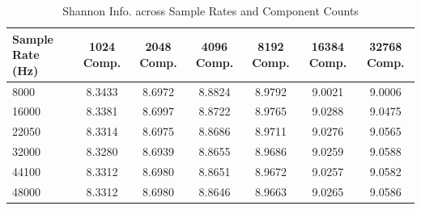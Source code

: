 \begin{table}[htbp]
\centering
\caption{Shannon Info. across Sample Rates and Component Counts}
\begin{tabular}{|l|c|c|c|c|c|c|}
\hline
Sample Rate (Hz) & 1024 Comp. & 2048 Comp. & 4096 Comp. & 8192 Comp. & 16384 Comp. & 32768 Comp. \\ \hline
8000 & 8.3433 & 8.6972 & 8.8824 & 8.9792 & 9.0021 & 9.0006 \\ \hline
16000 & 8.3381 & 8.6997 & 8.8722 & 8.9765 & 9.0288 & 9.0475 \\ \hline
22050 & 8.3314 & 8.6975 & 8.8686 & 8.9711 & 9.0276 & 9.0565 \\ \hline
32000 & 8.3280 & 8.6939 & 8.8655 & 8.9686 & 9.0259 & 9.0588 \\ \hline
44100 & 8.3312 & 8.6980 & 8.8651 & 8.9672 & 9.0257 & 9.0582 \\ \hline
48000 & 8.3312 & 8.6980 & 8.8646 & 8.9663 & 9.0265 & 9.0586 \\ \hline
\end{tabular}
\end{table}
